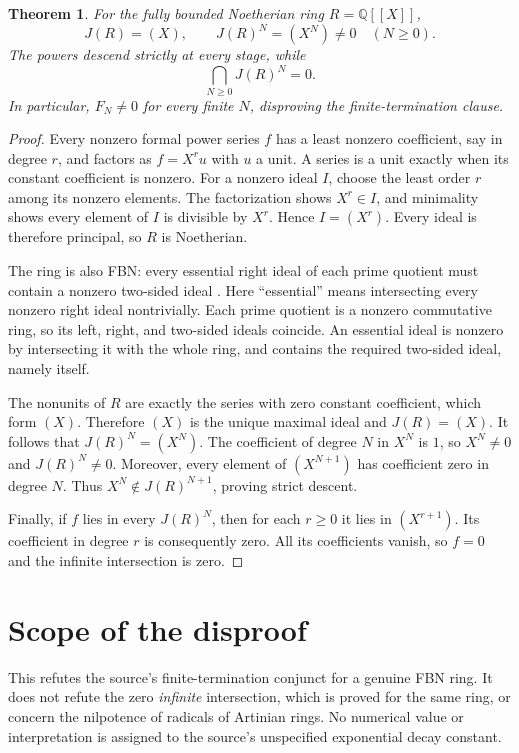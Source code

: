 \documentclass[11pt]{article}
\newtheorem{theorem}{Theorem}
\newcommand{\Q}{\mathbb Q}
\begin{document}
\begin{theorem}
For the fully bounded Noetherian ring $R=\Q[[X]]$,
\[
 J(R)=(X),\qquad J(R)^N=(X^N)\ne0\quad (N\geq0).
\]
The powers descend strictly at every stage, while
\[
 \bigcap_{N\geq0}J(R)^N=0.
\]
In particular, $F_N\ne0$ for every finite $N$, disproving the finite-termination clause.
\end{theorem}
\begin{proof}
Every nonzero formal power series $f$ has a least nonzero coefficient, say in degree $r$, and factors as $f=X^r u$ with $u$ a unit. A series is a unit exactly when its constant coefficient is nonzero. For a nonzero ideal $I$, choose the least order $r$ among its nonzero elements. The factorization shows $X^r\in I$, and minimality shows every element of $I$ is divisible by $X^r$. Hence $I=(X^r)$. Every ideal is therefore principal, so $R$ is Noetherian.

The ring is also FBN: every essential right ideal of each prime quotient must contain a nonzero two-sided ideal \cite[p.~1]{cg}. Here ``essential'' means intersecting every nonzero right ideal nontrivially. Each prime quotient is a nonzero commutative ring, so its left, right, and two-sided ideals coincide. An essential ideal is nonzero by intersecting it with the whole ring, and contains the required two-sided ideal, namely itself.

The nonunits of $R$ are exactly the series with zero constant coefficient, which form $(X)$. Therefore $(X)$ is the unique maximal ideal and $J(R)=(X)$. It follows that $J(R)^N=(X^N)$. The coefficient of degree $N$ in $X^N$ is $1$, so $X^N\ne0$ and $J(R)^N\ne0$. Moreover, every element of $(X^{N+1})$ has coefficient zero in degree $N$. Thus $X^N\notin J(R)^{N+1}$, proving strict descent.

Finally, if $f$ lies in every $J(R)^N$, then for each $r\geq0$ it lies in $(X^{r+1})$. Its coefficient in degree $r$ is consequently zero. All its coefficients vanish, so $f=0$ and the infinite intersection is zero.
\end{proof}

\section*{Scope of the disproof}
This refutes the source's finite-termination conjunct for a genuine FBN ring. It does not refute the zero \emph{infinite} intersection, which is proved for the same ring, or concern the nilpotence of radicals of Artinian rings. No numerical value or interpretation is assigned to the source's unspecified exponential decay constant.
\end{document}
